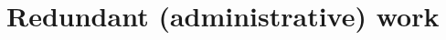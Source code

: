 \section{Redundant (administrative) work}
\label{section:node-level:redundant-admin}

% 
% 
% 
% 
% 
% 
% 
% 
% 
% 
% 
% 
% 
